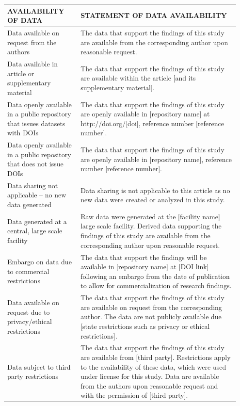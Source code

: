 \documentclass[%
 aip,
 amsmath,amssymb,
reprint, onecolumn %
]{revtex4-1}
\begin{document}
\begin{center}
\renewcommand\arraystretch{1.2}
\begin{tabular}{| >{\raggedright\arraybackslash}p{0.3\linewidth} | >{\raggedright\arraybackslash}p{0.65\linewidth} |}
\hline
\textbf{AVAILABILITY OF DATA} & \textbf{STATEMENT OF DATA AVAILABILITY}\\  
\hline
Data available on request from the authors
&
The data that support the findings of this study are available from the corresponding author upon reasonable request.
\\\hline
Data available in article or supplementary material
&
The data that support the findings of this study are available within the article [and its supplementary material].
\\\hline
Data openly available in a public repository that issues datasets with DOIs
&
The data that support the findings of this study are openly available in [repository name] at http://doi.org/[doi], reference number [reference number].
\\\hline
Data openly available in a public repository that does not issue DOIs
&
The data that support the findings of this study are openly available in [repository name], reference number [reference number].
\\\hline
Data sharing not applicable – no new data generated
&
Data sharing is not applicable to this article as no new data were created or analyzed in this study.
\\\hline
Data generated at a central, large scale facility
&
Raw data were generated at the [facility name] large scale facility. Derived data supporting the findings of this study are available from the corresponding author upon reasonable request.
\\\hline
Embargo on data due to commercial restrictions
&
The data that support the findings will be available in [repository name] at [DOI link] following an embargo from the date of publication to allow for commercialization of research findings.
\\\hline
Data available on request due to privacy/ethical restrictions
&
The data that support the findings of this study are available on request from the corresponding author. The data are not publicly available due [state restrictions such as privacy or ethical restrictions].
\\\hline
Data subject to third party restrictions
&
The data that support the findings of this study are available from [third party]. Restrictions apply to the availability of these data, which were used under license for this study. Data are available from the authors upon reasonable request and with the permission of [third party].
\\\hline
\end{tabular}
\end{center}
\end{document}
